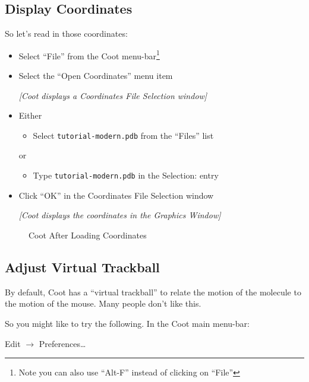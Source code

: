 \documentclass{article}
\begin{document}
\subsection{Display Coordinates}
So let's read in those coordinates:

\begin{itemize}
\item Select \textsf{``File''} from the Coot menu-bar\footnote{Note
    you can also use ``Alt-F'' instead of clicking on ``File''}
\item Select the \textsf{``Open Coordinates''} menu item

\textsl{  [Coot displays a Coordinates File Selection window]}

\item Either
  \begin{itemize}
  \item Select \texttt{tutorial-modern.pdb} from the ``Files'' list
  \end{itemize}
  or
  \begin{itemize}
  \item Type \texttt{tutorial-modern.pdb} in the Selection: entry
  \end{itemize}
\item Click \textsf{``OK''} in the Coordinates File Selection window

\textsl{  [Coot displays the coordinates in the Graphics Window]}

\end{itemize}

\begin{figure}[htbp]
  \begin{center}
    \leavevmode
    \epsfxsize 70mm
    \caption{Coot After Loading Coordinates}
    \label{fig:coordinates-coot}
  \end{center}
\end{figure}

\subsection{Adjust Virtual Trackball}
By default, Coot has a ``virtual trackball'' to relate the motion of
the molecule to the motion of the mouse.  Many people don't like this.

So you might like to try the following. In the Coot main menu-bar:

\textsf{Edit $\rightarrow$ Preferences\ldots}
\end{document}

